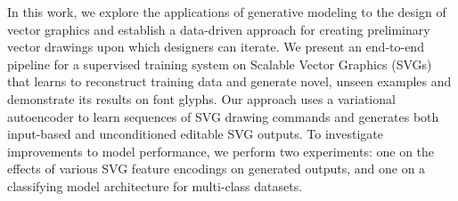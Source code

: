 In this work, we explore the applications of generative modeling to the design of vector graphics and establish a data-driven approach for creating preliminary vector drawings upon which designers can iterate.
We present an end-to-end pipeline for a supervised training system on Scalable Vector Graphics (SVGs) that learns to reconstruct training data and generate novel, unseen examples and demonstrate its results on font glyphs.
Our approach uses a variational autoencoder to learn sequences of SVG drawing commands and generates both input-based and unconditioned editable SVG outputs.
To investigate improvements to model performance, we perform two experiments: one on the effects of various SVG feature encodings on generated outputs, and one on a classifying model architecture for multi-class datasets.
